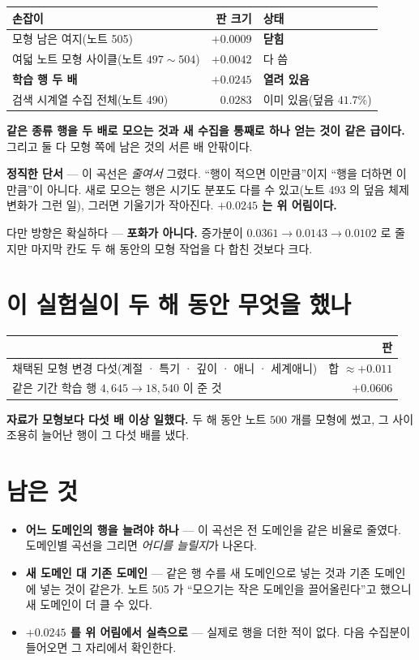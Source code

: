 \documentclass[11pt]{article}
\begin{document}
\begin{center}
\begin{tabular}{lrl}
\hline
손잡이 & 판 크기 & 상태 \\
\hline
모형 남은 여지(노트 505) & $+0.0009$ & \textbf{닫힘} \\
여덟 노트 모형 사이클(노트 $497\!\sim\!504$) & $+0.0042$ & 다 씀 \\
\textbf{학습 행 두 배} & $\mathbf{+0.0245}$ & \textbf{열려 있음} \\
검색 시계열 수집 전체(노트 490) & $0.0283$ & 이미 있음(덮음 $41.7\%$) \\
\hline
\end{tabular}
\end{center}

\textbf{같은 종류 행을 두 배로 모으는 것과 새 수집을 통째로 하나 얻는 것이
같은 급이다.} 그리고 둘 다 모형 쪽에 남은 것의 서른 배 안팎이다.

\textbf{정직한 단서} --- 이 곡선은 \emph{줄여서} 그렸다. ``행이 적으면
이만큼''이지 ``행을 더하면 이만큼''이 아니다. 새로 모으는 행은 시기도
분포도 다를 수 있고(노트 493 의 덮음 체제 변화가 그런 일), 그러면 기울기가
작아진다. \textbf{$+0.0245$ 는 위 어림이다.}

다만 방향은 확실하다 --- \textbf{포화가 아니다.} 증가분이 $0.0361 \to
0.0143 \to 0.0102$ 로 줄지만 마지막 칸도 두 해 동안의 모형 작업을 다
합친 것보다 크다.

\section{이 실험실이 두 해 동안 무엇을 했나}

\begin{center}
\begin{tabular}{lr}
\hline
& 판 \\
\hline
채택된 모형 변경 다섯(계절 · 특기 · 깊이 · 애니 · 세계애니) & 합 $\approx +0.011$ \\
같은 기간 학습 행 $4{,}645 \to 18{,}540$ 이 준 것 & $\mathbf{+0.0606}$ \\
\hline
\end{tabular}
\end{center}

\textbf{자료가 모형보다 다섯 배 이상 일했다.} 두 해 동안 노트 $500$ 개를
모형에 썼고, 그 사이 조용히 늘어난 행이 그 다섯 배를 냈다.

\section*{남은 것}

\begin{itemize}
\item \textbf{어느 도메인의 행을 늘려야 하나} --- 이 곡선은 전 도메인을
같은 비율로 줄였다. 도메인별 곡선을 그리면 \emph{어디를 늘릴지}가 나온다.
\item \textbf{새 도메인 대 기존 도메인} --- 같은 행 수를 새 도메인으로
넣는 것과 기존 도메인에 넣는 것이 같은가. 노트 505 가 ``모으기는 작은
도메인을 끌어올린다''고 했으니 새 도메인이 더 클 수 있다.
\item \textbf{$+0.0245$ 를 위 어림에서 실측으로} --- 실제로 행을 더한
적이 없다. 다음 수집분이 들어오면 그 자리에서 확인한다.
\end{itemize}
\end{document}

